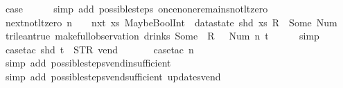 \begin{isabellebody}
\ {\isacharquery}case\isanewline
\ \ \ \ \isamarkupfalse%
\ {\isacharparenleft}simp\ add{\isacharcolon}\ possible{\isacharunderscore}steps{\isacharunderscore}{}\ once{\isacharunderscore}none{\isacharunderscore}remains{\isacharunderscore}not{\isacharunderscore}lt{\isacharunderscore}zero{\isacharparenright}\isanewline
{}\isamarkupfalse%
%
\endisatagproof
{\isafoldproof}%
%
\isadelimproof
\isanewline
%
\endisadelimproof
\isanewline
{}\isamarkupfalse%
\ next{\isacharunderscore}not{\isacharunderscore}lt{\isacharunderscore}zero{\isacharcolon}\ {\isachardoublequoteopen}n\ {\isasymge}\ {}\ {\isasymLongrightarrow}\ nxt\ {\isacharparenleft}{\isasymlambda}xs{\isachardot}\ MaybeBoolInt\ {\isacharparenleft}{\isacharless}{\isacharparenright}\ {\isacharparenleft}datastate\ {\isacharparenleft}shd\ xs{\isacharparenright}\ {\isacharparenleft}R\ {}{\isacharparenright}{\isacharparenright}\ {\isacharparenleft}Some\ {\isacharparenleft}Num\ {}{\isacharparenright}{\isacharparenright}\ {\isasymnoteq}\ trilean{\isachardot}true{\isacharparenright}\ {\isacharparenleft}make{\isacharunderscore}full{\isacharunderscore}observation\ drinks\ {\isacharparenleft}Some\ {}{\isacharparenright}\ {\isacharless}R\ {}\ {\isacharcolon}{\isacharequal}\ Num\ n{\isachargreater}\ t{\isacharparenright}{\isachardoublequoteclose}\isanewline
%
\isadelimproof
\ \ \ \ %
\endisadelimproof
%
\isatagproof
{}\isamarkupfalse%
\ simp\isanewline
\ \ \ \ \isamarkupfalse%
\ {\isacharparenleft}case{\isacharunderscore}tac\ {\isachardoublequoteopen}shd\ t\ {\isacharequal}\ {\isacharparenleft}STR\ {\isacharprime}{\isacharprime}vend{\isacharprime}{\isacharprime}{\isacharcomma}\ {\isacharbrackleft}{\isacharbrackright}{\isacharparenright}{\isachardoublequoteclose}{\isacharparenright}\isanewline
\ \ \ \ \isamarkupfalse%
\ {\isacharparenleft}case{\isacharunderscore}tac\ {\isachardoublequoteopen}n\ {\isacharequal}\ {}{\isachardoublequoteclose}{\isacharparenright}\isanewline
\ \ \ \ \ \ \isamarkupfalse%
\ {\isacharparenleft}simp\ add{\isacharcolon}\ possible{\isacharunderscore}steps{\isacharunderscore}vend{\isacharunderscore}insufficient{\isacharparenright}\isanewline
\ \ \ \ \ \isamarkupfalse%
\ {\isacharparenleft}simp\ add{\isacharcolon}\ possible{\isacharunderscore}steps{\isacharunderscore}vend{\isacharunderscore}sufficient\ updates{\isacharunderscore}vend{\isacharparenright}\isanewline
\ \ \ \ \isamarkupfalse%

\end{isabellebody}
